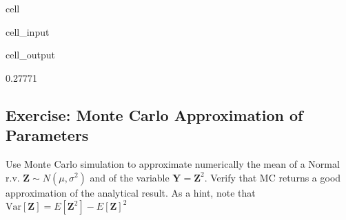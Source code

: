 \documentclass[letterpaper,10pt,english]{jupyterBook}
\begin{document}
\begin{sphinxuseclass}{cell}\begin{sphinxVerbatimInput}

\begin{sphinxuseclass}{cell_input}
\begin{sphinxVerbatim}[commandchars=\\\{\}]
  
  \PYG{p}{[}\PYG{p}{]}
    
    
    
\end{sphinxVerbatim}

\end{sphinxuseclass}\end{sphinxVerbatimInput}
\begin{sphinxVerbatimOutput}

\begin{sphinxuseclass}{cell_output}
\begin{sphinxVerbatim}[commandchars=\\\{\}]
0.27771
\end{sphinxVerbatim}

\end{sphinxuseclass}\end{sphinxVerbatimOutput}

\end{sphinxuseclass}

\subsection{Exercise: Monte Carlo Approximation of Parameters}
\label{\detokenize{01:exercise-monte-carlo-approximation-of-parameters}}
\sphinxAtStartPar
Use Monte Carlo simulation to approximate numerically the mean of a Normal r.v. \({\mathbf Z} \sim N(\mu,\sigma^2)\) and of the variable \({\mathbf Y}= {\mathbf Z}^2\). Verify that MC returns a good approximation of the analytical result. As a hint, note that \(\mbox{Var}[{\mathbf Z}]=E[{\mathbf Z}^2]-E[{\mathbf Z}]^2\)
\end{document}
